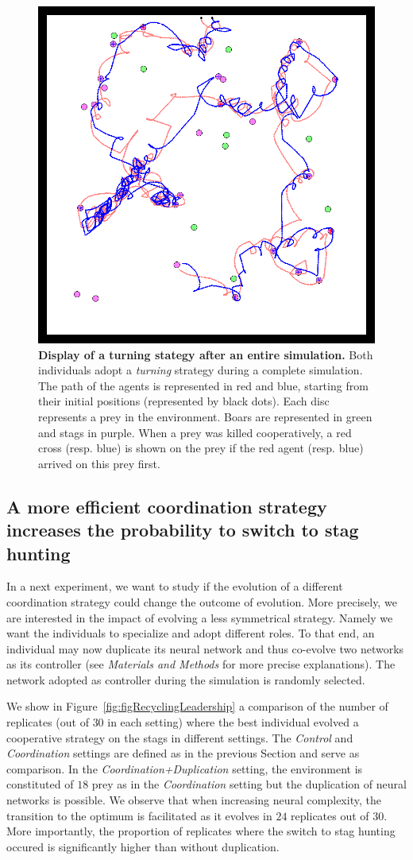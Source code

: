     \begin{figure}[h]
      \centering
        \includegraphics[width=0.7\linewidth]{fig/ArticleBio2/Fig3.png}
        \caption{\textbf{Display of a turning stategy after an entire simulation.}
        Both individuals adopt a \emph{turning} strategy during a complete simulation. The path of the agents is represented in red and blue, starting from their initial positions (represented by black dots). Each disc represents a prey in the environment. Boars are represented in green and stags in purple. When a prey was killed cooperatively, a red cross (resp. blue) is shown on the prey if the red agent (resp. blue) arrived on this prey first.}
      \label{fig:figTurningBehaviour}
    \end{figure}


  \subsection{A more efficient coordination strategy increases the probability to switch to stag hunting}
    In a next experiment, we want to study if the evolution of a different coordination strategy could change the outcome of evolution. More precisely, we are interested in the impact of evolving a less symmetrical strategy. Namely we want the individuals to specialize and adopt different roles. To that end, an individual may now duplicate its neural network and thus co-evolve two networks as its controller (see \emph{Materials and Methods} for more precise explanations). The network adopted as controller during the simulation is randomly selected.

    We show in Figure~\ref{fig:figRecyclingLeadership} a comparison of the number of replicates (out of $30$ in each setting) where the best individual evolved a cooperative strategy on the stags in different settings. The \emph{Control} and \emph{Coordination} settings are defined as in the previous Section and serve as comparison. In the \emph{Coordination+Duplication} setting, the environment is constituted of $18$ prey as in the \emph{Coordination} setting but the duplication of neural networks is possible. We observe that when increasing neural complexity, the transition to the optimum is facilitated as it evolves in $24$ replicates out of $30$. More importantly, the proportion of replicates where the switch to stag hunting occured is significantly higher than without duplication. 


